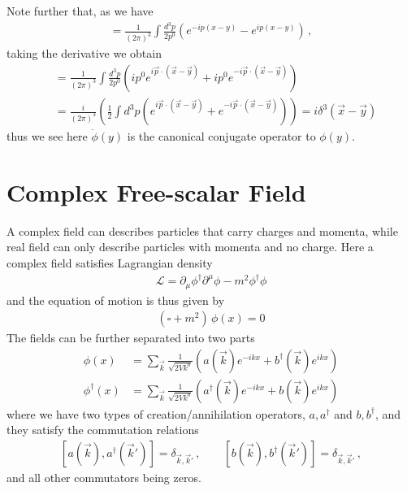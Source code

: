\documentclass[11pt, onesided]{book}
\theoremstyle{break}
\theoremstyle{break}
\newcommand{\pd}{\partial}
\begin{document}
Note further that, as we have
\begin{align*}
[\phi(x), \phi(y)] = \frac{1}{(2\pi)^3}\int \frac{d^3p}{2p^0} \left( e^{-ip(x-y)} - e^{ip(x-y)}\right)\,,
\end{align*}
taking the derivative we obtain
\begin{align*}
[\phi(x), \dot{\phi}(y)] 
&= \frac{1}{(2\pi)^3}\int  \frac{d^3p}{2p^0}\left( ip^0 e^{i\vec{p}\cdot (\vec{x} - \vec{y})} + ip^0 e^{-i \vec{p}\cdot (\vec{x} -\vec{y})}\right)\\
&= \frac{i}{(2\pi)^3} \left( \frac{1}{2} \int d^3p \left( e^{i\vec{p}\cdot (\vec{x}-\vec{y})} + e^{-i \vec{p}\cdot (\vec{x}-\vec{y})}\right) \right)= i\delta^3\left(\vec{x} - \vec{y}
\right)
\end{align*}
thus we see here $\dot{\phi}(y)$ is the canonical conjugate operator to $\phi(y)$. \\

\section[Complex Free-scalar Field]{\color{red}Complex Free-scalar Field\color{black}}
A complex field can describes particles that carry charges and momenta, while real field can only describe particles with momenta and no charge. Here a complex field satisfies Lagrangian density
\begin{align*}
\mathcal{L} = \pd_\mu \phi^\dagger \pd^\mu \phi - m^2 \phi^\dagger\phi
\end{align*}
and the equation of motion is thus given by
\begin{align*}
(\square + m^2)\,\phi(x) = 0
\end{align*}
The fields can be further separated into two parts
\begin{align}
\phi(x) &= \sum_{\vec{k}} \frac{1}{\sqrt{2Vk^0}} \left( a(\vec{k}) e^{-ikx} + b^\dagger(\vec{k}) e^{ikx}\right) \\
\phi^\dagger(x) &= \sum_{\vec{k}} \frac{1}{\sqrt{2Vk^0}} \left( a^\dagger(\vec{k}) e^{-ikx} + b(\vec{k}) e^{ikx}\right)
\end{align}
where we have two types of creation/annihilation operators, $a, a^\dagger$ and $b, b^\dagger$, and they satisfy the commutation relations 
\begin{align*}
\left[a(\vec{k}), a^\dagger(\vec{k}')\right] = \delta_{\vec{k}, \vec{k}'}\,,\qquad
\left[b(\vec{k}), b^\dagger(\vec{k}')\right] = \delta_{\vec{k},\vec{k}'}\,,
\end{align*}
and all other commutators being zeros.\\
\end{document}
